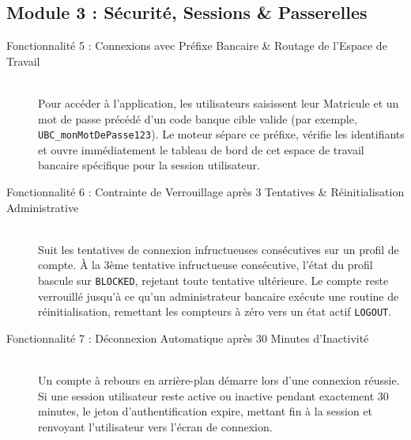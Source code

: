 \documentclass[12pt,a4paper]{article}
\begin{document}
	\subsection{Module 3 : Sécurité, Sessions \& Passerelles}
	\begin{description}
		\item[Fonctionnalité 5 : Connexions avec Préfixe Bancaire \& Routage de l'Espace de Travail] ~\\
		Pour accéder à l'application, les utilisateurs saisissent leur Matricule et un mot de passe précédé d'un code banque cible valide (par exemple, \texttt{UBC\_monMotDePasse123}). Le moteur sépare ce préfixe, vérifie les identifiants et ouvre immédiatement le tableau de bord de cet espace de travail bancaire spécifique pour la session utilisateur.
		
		\item[Fonctionnalité 6 : Contrainte de Verrouillage après 3 Tentatives \& Réinitialisation Administrative] ~\\
		Suit les tentatives de connexion infructueuses consécutives sur un profil de compte. À la 3ème tentative infructueuse consécutive, l'état du profil bascule sur \texttt{BLOCKED}, rejetant toute tentative ultérieure. Le compte reste verrouillé jusqu'à ce qu'un administrateur bancaire exécute une routine de réinitialisation, remettant les compteurs à zéro vers un état actif \texttt{LOGOUT}.
		
		\item[Fonctionnalité 7 : Déconnexion Automatique après 30 Minutes d'Inactivité] ~\\
		Un compte à rebours en arrière-plan démarre lors d'une connexion réussie. Si une session utilisateur reste active ou inactive pendant exactement 30 minutes, le jeton d'authentification expire, mettant fin à la session et renvoyant l'utilisateur vers l'écran de connexion.
	\end{description}
	
\end{document}

